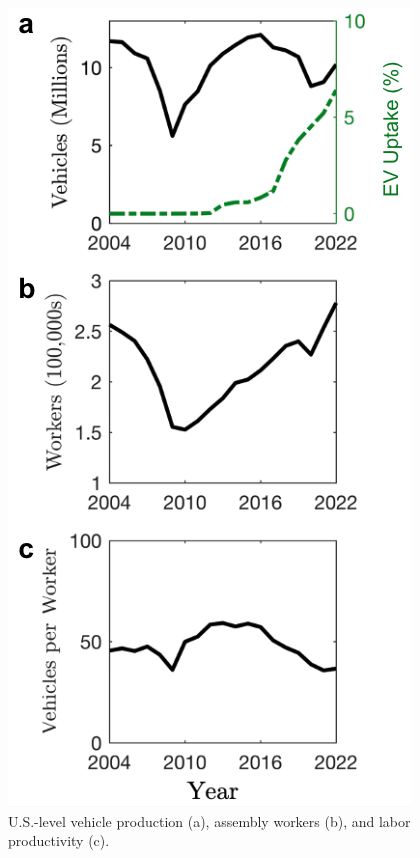 \documentclass[sn-mathphys,Numbered]{sn-jnl}%
\begin{document}
\begin{appendices}
\begin{figure}[ht]
\centering
\includegraphics[width=0.6\linewidth]{figures/fig_us_metrics.png}
\caption{U.S.-level vehicle production (a), assembly workers (b), and labor productivity (c). }
\label{fig:us-metrics}
\end{figure}


\end{appendices}
\end{document}
